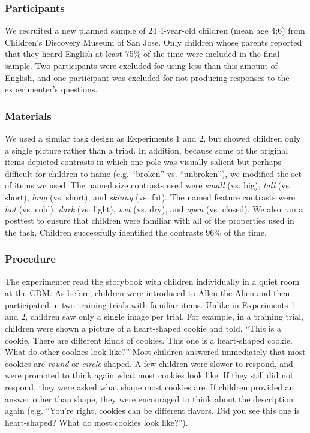 \documentclass[man]{apa2}
\begin{document}
\subsubsection{Participants}

We recruited a new planned sample of 24 4-year-old children (mean age 4;6) from Children's Discovery Museum of San Jose.  Only children whose parents reported that they heard English at least 75\% of the time were included in the final sample.  Two participants were excluded for using less than this amount of English, and one participant was excluded for not producing responses to the experimenter's questions.

\subsubsection{Materials}

We used a similar task design as Experiments 1 and 2, but showed children only a single picture rather than a triad.  In addition, because some of the original items depicted contrasts in which one pole was visually salient but perhaps difficult for children to name (e.g. ``broken'' vs. ``unbroken''), we modified the set of items we used.  The named size contrasts used were \emph{small} (vs. big), \emph{tall} (vs. short), \emph{long} (vs. short), and \emph{skinny} (vs. fat).  The named feature contrasts were \emph{hot} (vs. cold), \emph{dark} (vs. light), \emph{wet} (vs. dry), and \emph{open} (vs. closed).  We also ran a posttest to ensure that children were familiar with all of the properties used in the task.  Children successfully identified the contrasts 96\% of the time.

\subsubsection{Procedure}

The experimenter read the storybook with children individually in a quiet room at the CDM. As before, children were introduced to Allen the Alien and then participated in two training trials with familiar items. Unlike in  Experiments 1 and 2, children saw only a single image per trial. For example, in a training trial, children were shown a picture of a heart-shaped cookie and told, ``This is a cookie.  There are different kinds of cookies.  This one is a heart-shaped cookie.  What do other cookies look like?'' Most children answered immediately that most cookies are \emph{round} or \emph{circle}-shaped. A few children were slower to respond, and were promoted to think again what most cookies look like. If they still did not respond, they were asked what shape most cookies are.  If children provided an answer other than shape, they were encouraged to think about the description again (e.g. ``You're right, cookies can be different flavors. Did you see this one is heart-shaped?  What do most cookies look like?''). 
\end{document}
